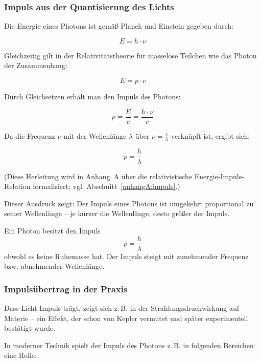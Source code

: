 \subsubsection{Impuls aus der Quantisierung des Lichts}

Die Energie eines Photons ist gemäß Planck und Einstein gegeben durch:

\[
E = h \cdot \nu
\]

Gleichzeitig gilt in der Relativitätstheorie für masselose Teilchen wie das Photon der Zusammenhang:

\[
E = p \cdot c
\]

Durch Gleichsetzen erhält man den Impuls des Photons:

\[
p = \frac{E}{c} = \frac{h \cdot \nu}{c}
\]

Da die Frequenz \(\nu\) mit der Wellenlänge \(\lambda\) über \(\nu = \frac{c}{\lambda}\) verknüpft ist, ergibt sich:

\[
p = \frac{h}{\lambda} \tag{III.3}
\]

(Diese Herleitung wird in Anhang~A über die relativistische Energie-Impuls-Relation formalisiert; vgl. Abschnitt~\ref{anhangA:impuls}.)

Dieser Ausdruck zeigt: Der Impuls eines Photons ist umgekehrt proportional zu seiner Wellenlänge – je kürzer die Wellenlänge, desto größer der Impuls.
\medskip
\begin{tcolorbox}[physikbox,title=Photonenimpuls]
	\label{box:Photonenimpuls}
	Ein Photon besitzt den Impuls
	\[
	p = \frac{h}{\lambda}
	\]
	obwohl es keine Ruhemasse hat. Der Impuls steigt mit zunehmender Frequenz bzw. abnehmender Wellenlänge.
\end{tcolorbox}

\subsubsection{Impulsübertrag in der Praxis}

Dass Licht Impuls trägt, zeigt sich z.\,B. in der Strahlungsdruckwirkung auf Materie – ein Effekt, der schon von Kepler vermutet und später experimentell bestätigt wurde. 

In moderner Technik spielt der Impuls des Photons z.\,B. in folgenden Bereichen eine Rolle:

